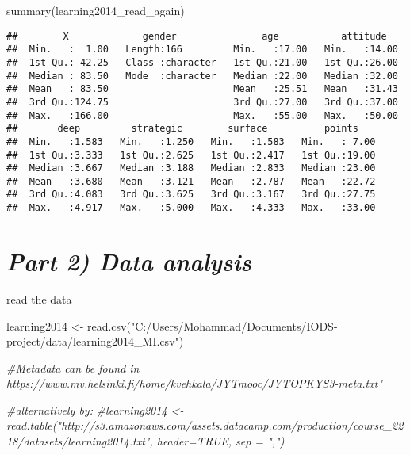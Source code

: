 \documentclass[
]{article}
\newenvironment{Shaded}{\begin{snugshade}}{\end{snugshade}}
\newcommand{\CommentTok}[1]{\textcolor[rgb]{0.56,0.35,0.01}{\textit{#1}}}
\newcommand{\FunctionTok}[1]{\textcolor[rgb]{0.00,0.00,0.00}{#1}}
\newcommand{\NormalTok}[1]{#1}
\newcommand{\OtherTok}[1]{\textcolor[rgb]{0.56,0.35,0.01}{#1}}
\newcommand{\StringTok}[1]{\textcolor[rgb]{0.31,0.60,0.02}{#1}}
\begin{document}
\begin{Shaded}
\begin{Highlighting}[]
\FunctionTok{summary}\NormalTok{(learning2014\_read\_again)}
\end{Highlighting}
\end{Shaded}

\begin{verbatim}
##        X             gender               age           attitude    
##  Min.   :  1.00   Length:166         Min.   :17.00   Min.   :14.00  
##  1st Qu.: 42.25   Class :character   1st Qu.:21.00   1st Qu.:26.00  
##  Median : 83.50   Mode  :character   Median :22.00   Median :32.00  
##  Mean   : 83.50                      Mean   :25.51   Mean   :31.43  
##  3rd Qu.:124.75                      3rd Qu.:27.00   3rd Qu.:37.00  
##  Max.   :166.00                      Max.   :55.00   Max.   :50.00  
##       deep         strategic        surface          points     
##  Min.   :1.583   Min.   :1.250   Min.   :1.583   Min.   : 7.00  
##  1st Qu.:3.333   1st Qu.:2.625   1st Qu.:2.417   1st Qu.:19.00  
##  Median :3.667   Median :3.188   Median :2.833   Median :23.00  
##  Mean   :3.680   Mean   :3.121   Mean   :2.787   Mean   :22.72  
##  3rd Qu.:4.083   3rd Qu.:3.625   3rd Qu.:3.167   3rd Qu.:27.75  
##  Max.   :4.917   Max.   :5.000   Max.   :4.333   Max.   :33.00
\end{verbatim}

\hypertarget{part-2-data-analysis}{%
\section{\texorpdfstring{\emph{Part 2) Data
analysis}}{Part 2) Data analysis}}\label{part-2-data-analysis}}

read the data

\begin{Shaded}
\begin{Highlighting}[]
\NormalTok{learning2014 }\OtherTok{\textless{}{-}} \FunctionTok{read.csv}\NormalTok{(}\StringTok{"C:/Users/Mohammad/Documents/IODS{-}project/data/learning2014\_MI.csv"}\NormalTok{)}

\CommentTok{\#Metadata can be found in https://www.mv.helsinki.fi/home/kvehkala/JYTmooc/JYTOPKYS3{-}meta.txt"}

\CommentTok{\#alternatively by:}
\CommentTok{\#learning2014 \textless{}{-} read.table("http://s3.amazonaws.com/assets.datacamp.com/production/course\_2218/datasets/learning2014.txt", header=TRUE, sep = ",")}
\end{Highlighting}
\end{Shaded}
\end{document}
